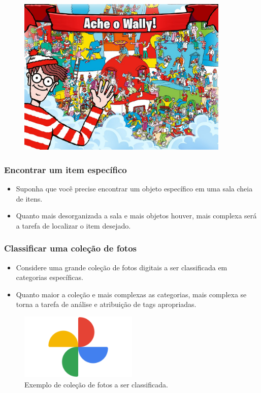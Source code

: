 \documentclass[12pt]{beamer}
\begin{document}
\begin{frame}
    \begin{figure}[htb]
        \centering
        \includegraphics[width=0.9\textwidth]{wally.jpg}
        \label{fig:wally2}
    \end{figure}
\end{frame}

\begin{frame}
    \frametitle{Encontrar um item específico}
    \begin{itemize}\large
        \item Suponha que você precise encontrar um objeto específico em uma sala cheia de itens.
        \item Quanto mais desorganizada a sala e mais objetos houver, mais complexa será a tarefa de localizar o item desejado.
    \end{itemize}
\end{frame}

\begin{frame}
    \frametitle{Classificar uma coleção de fotos}

    \begin{itemize}
        \item Considere uma grande coleção de fotos digitais a ser classificada em categorias específicas.
        \item Quanto maior a coleção e mais complexas as categorias, mais complexa se torna a tarefa de análise e atribuição de tags apropriadas.
    \end{itemize}

    \begin{figure}[htb]
        \centering
        \includegraphics[width=0.5\textwidth]{fotos.jpg}
        \caption{Exemplo de coleção de fotos a ser classificada.}
        \label{fig:fotos}
    \end{figure}
\end{frame}
\end{document}
